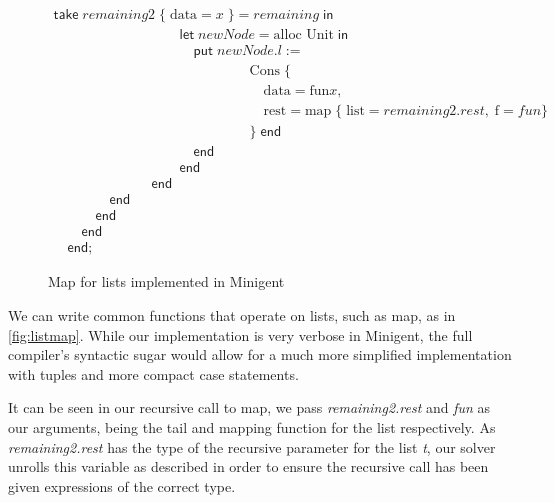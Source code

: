 \begin{figure}
\[\begin{array}{l}
\textsf{take}\; remaining2\; \{\; \text{data} = x\; \} = remaining\; \textsf{in}  \\
\hspace{9em} 
\textsf{let}\; newNode = \text{alloc Unit}\; \textsf{in} \\
\hspace{10em} 
\textsf{put}\; newNode.l :=  \\
\hspace{14em} 
\text{Cons}\; \{ \\
\hspace{15em}
\text{data} = \text{fun} x, \\
\hspace{15em} 
\text{rest} = \text{map}\; \{\; \text{list} = remaining2.rest,\; \text{f} = fun \} \\
\hspace{14em} 
\}\; \textsf{end} \\
\hspace{10em} 
\textsf{end} \\
\hspace{9em} 
\textsf{end} \\
\hspace{7em} 
\textsf{end} \\
\hspace{4em} 
\textsf{end} \\
\hspace{3em} 
\textsf{end} \\
\hspace{2em} 
\textsf{end} \\
\hspace{1em} 
\textsf{end};
        
    \end{array}    
    \]
    
    \caption{Map for lists implemented in Minigent}
    \label{fig:listmap}
\end{figure}

We can write common functions that operate on lists, such as \textsf{map},
as in \autoref{fig:listmap}. While our implementation is very verbose in Minigent,
the full compiler's syntactic sugar would allow for a much more simplified
implementation with tuples and more compact \textsf{case} statements.

It can be seen in our recursive call to map, we pass \textit{remaining2.rest} and
\textit{fun} as our arguments, being the tail and mapping function for the list
respectively. As \textit{remaining2.rest} has the type of the recursive parameter
for the list \textit{t}, our solver unrolls this variable as described in order
to ensure the recursive call has been given expressions of the correct type.

